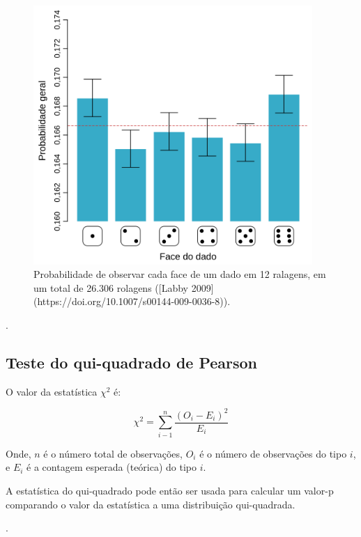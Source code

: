 \documentclass[
]{book}
\begin{document}
\begin{figure}

{\centering \includegraphics[width=400px]{figs/Labby_results} 

}

\caption{Probabilidade de observar cada face de um dado em 12 ralagens, em um total de 26.306 rolagens ([Labby 2009](https://doi.org/10.1007/s00144-009-0036-8)).}\label{fig:labbyg}
\end{figure}

.\linebreak

\hypertarget{teste-do-qui-quadrado-de-pearson}{%
\subsection{Teste do qui-quadrado de Pearson}\label{teste-do-qui-quadrado-de-pearson}}

O valor da estatística \(\chi^2\) é:

\begin{equation} 
\chi^2=\displaystyle\sum_{i-1}^{n}\frac{(O_i-E_i)^2}{E_i} 
  \label{eq:quiquadrado}
\end{equation}

Onde, \(n\) é o número total de observações, \(O_i\) é o número de observações do tipo \(i\), e \(E_i\) é a contagem esperada (teórica) do tipo \(i\).

A estatística do qui-quadrado pode então ser usada para calcular um valor-p comparando o valor da estatística a uma distribuição qui-quadrada.

.\linebreak
\end{document}
